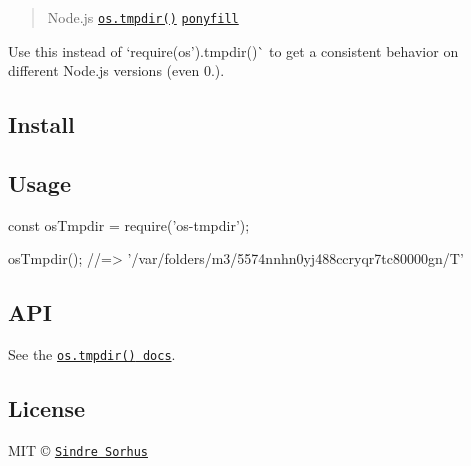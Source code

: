 \begin{quote}
Node.\+js \href{https://nodejs.org/api/os.html#os_os_tmpdir}{\tt {\ttfamily os.\+tmpdir()}} \href{https://ponyfill.com}{\tt ponyfill} \end{quote}


Use this instead of `require(\textquotesingle{}os').tmpdir()\`{} to get a consistent behavior on different Node.\+js versions (even 0.).

\subsection*{Install}




\subsection*{Usage}


\begin{DoxyCode}
const osTmpdir = require('os-tmpdir');

osTmpdir();
//=> '/var/folders/m3/5574nnhn0yj488ccryqr7tc80000gn/T'
\end{DoxyCode}


\subsection*{A\+PI}

See the \href{https://nodejs.org/api/os.html#os_os_tmpdir}{\tt {\ttfamily os.\+tmpdir()} docs}.

\subsection*{License}

M\+IT © \href{https://sindresorhus.com}{\tt Sindre Sorhus} 